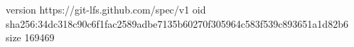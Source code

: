version https://git-lfs.github.com/spec/v1
oid sha256:34dc318c90c6f1fac2589adbe7135b60270f305964c583f539c893651a1d82b6
size 169469
